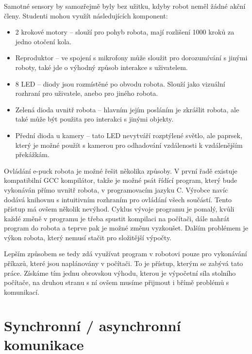 \documentclass[12pt,notitlepage]{report}
\begin{document}
    Samotné sensory by samozřejmě byly bez užitku, kdyby robot neměl žádné
    akční členy. Studenti mohou využít následujících komponent:
    \begin{itemize}
        \item 2 krokové motory -- slouží pro pohyb robota, mají rozlišení 1000
        kroků za jedno otočení kola.

        \item Reproduktor -- ve spojení s mikrofony může sloužit pro dorozumívání s
        jinými roboty, také jde o výhodný způsob interakce s uživatelem.

        \item 8 LED -- diody jsou rozmístěné po obvodu robota. Slouží jako
        vizuální rozhraní pro uživatele, anebo pro jiného robota.

        \item Zelená dioda uvnitř robota -- hlavním jejím posláním je zkrášlit
        robota, ale také může být použita pro interakci s jinými objekty.

        \item Přední dioda u kamery -- tato LED nevytváří rozptýlené světlo,
        ale paprsek, který je možné použít s kamerou pro odhadování vzdálenosti
        k vzdálenějším překážkám.
    \end{itemize}

    Ovládání e-puck robota je možné řešit několika způsoby. V první řadě
    existuje kompatibilní GCC kompilátor, takže je možné psát řídící program,
    který bude vykonáván přímo uvnitř robota, v programovacím jazyku C. Výrobce
    navíc dodává knihovnu s intuitivním rozhraním pro ovládání všech součástí.
    Tento přístup má ovšem několik nevýhod. Cyklus vývoje programu je pomalý,
    kvůli každé změně v programu je třeba spustit kompilaci na počítači, dále
    nahrát program do robota a teprve pak je možné změnu vyzkoušet. Dalším
    problémem je výkon robota, který nemusí stačit pro složitější výpočty.

    Lepším způsobem se tedy zdá využívat program v robotovi pouze pro
    vykonávání příkazů, které jsou naplánovány v počítači. To je přístup,
    kterým se zabývá tato práce. Získáme tím jednu obrovskou výhodu, kterou je
    výpočetní síla stolního počítače, na druhou stranu s ní ovšem musíme
    přijmout i břímě problémů s komunikací.

    \section{Synchronní / asynchronní komunikace}
    \label{sync/async}
\end{document}
